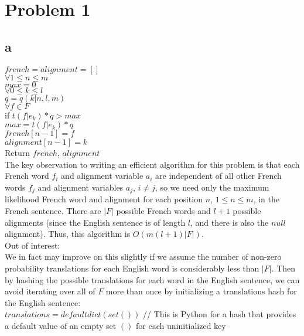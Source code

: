 \documentclass[twoside]{homework}
\begin{document}
\maketitle

\section*{Problem 1}
\subsection*{a}
$french = alignment = [ ]$ \\
$\forall 1 \leq n \leq m$ \\
\indent $max = 0$ \\
\indent $\forall 0 \leq k \leq l$ \\
\indent \indent $q = q(k|n,l,m)$ \\
\indent \indent $\forall f \in F$ \\
\indent \indent \indent if $t(f|e_k) * q > max$ \\
\indent \indent \indent \indent $max = t(f|e_k) * q$ \\
\indent \indent \indent \indent $french[n-1] = f$ \\
\indent \indent \indent \indent $alignment[n-1] = k$ \\
Return $french$, $alignment$ \\
The key observation to writing an efficient algorithm for this problem is that each French word $f_i$ and alignment variable $a_i$ are independent of all other French words $f_j$ and alignment variables $a_j$, $i \neq j$, so we need only the maximum likelihood French word and alignment for each position $n$, $1 \leq n \leq m$, in the French sentence.  There are $|F|$ possible French words and $l + 1$ possible alignments (since the English sentence is of length $l$, and there is also the $null$ alignment).  Thus, this algorithm is $O(m(l+1)|F|)$. \\
Out of interest: \\
We in fact may improve on this slightly if we assume the number of non-zero probability translations for each English word is considerably less than $|F|$.  Then by hashing the possible translations for each word in the English sentence, we can avoid iterating over all of $F$ more than once by initializing a translations hash for the English sentence: \\
$translations = defaultdict(set())$ // This is Python for a hash that provides a default value of an empty set $()$ for each uninitialized key \\
\end{document}

